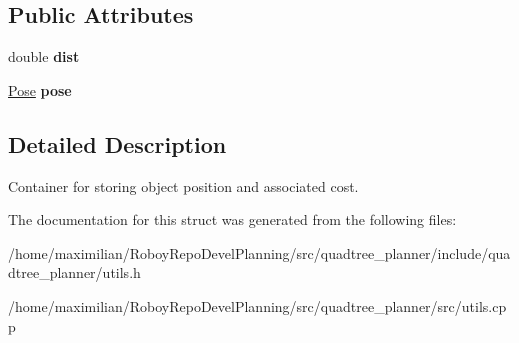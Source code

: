 \subsection*{Public Attributes}
\begin{DoxyCompactItemize}
\item 
\mbox{\label{structquadtree__planner_1_1PoseWithDist_ab549c0b14696617a99075edad7d73610}} 
double {\bfseries dist}
\item 
\mbox{\label{structquadtree__planner_1_1PoseWithDist_a191cde7579ae0af7f1fec2c731c34649}} 
\hyperlink{structquadtree__planner_1_1Pose}{Pose} {\bfseries pose}
\end{DoxyCompactItemize}


\subsection{Detailed Description}
Container for storing object position and associated cost. 

The documentation for this struct was generated from the following files\+:\begin{DoxyCompactItemize}
\item 
/home/maximilian/\+Roboy\+Repo\+Devel\+Planning/src/quadtree\+\_\+planner/include/quadtree\+\_\+planner/utils.\+h\item 
/home/maximilian/\+Roboy\+Repo\+Devel\+Planning/src/quadtree\+\_\+planner/src/utils.\+cpp\end{DoxyCompactItemize}
